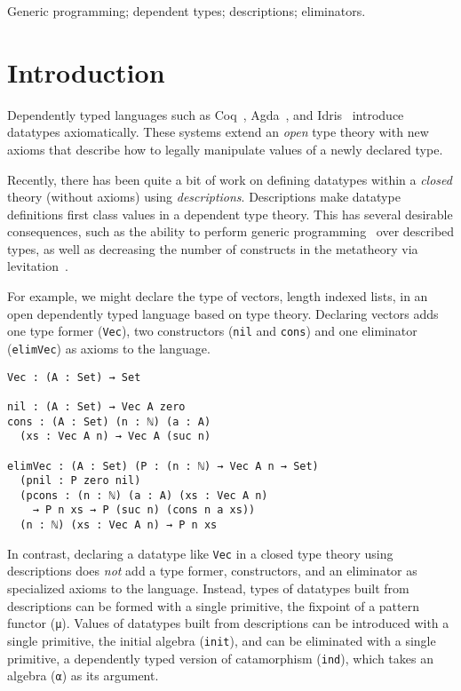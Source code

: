 \documentclass[preprint,nonatbib]{sigplanconf}
\begin{document}
\keywords
Generic programming; dependent types; descriptions; eliminators.

\section{Introduction}
\label{sec:intro}
Dependently typed languages such as
{\sc Coq}~\citep{coq08},
{\sc Agda}~\citep{norell2007towards}, and 
{\sc Idris}~\citep{brady2011idris} 
introduce datatypes axiomatically.
These systems extend an {\it open} type theory with new axioms that
describe how to legally manipulate values of a newly declared type.


Recently, there has been quite a bit of work on defining datatypes
within a {\it closed}
theory (without axioms) using {\it descriptions}.
Descriptions make datatype definitions first class values in a
dependent type theory. This has several desirable consequences, such as the
ability to perform generic programming~\citep{Chapman:2010:GAL:1932681.1863547,mcbride2010ornamental,dagand:phd}
over described types, as well as decreasing the number of constructs in the
metatheory via
levitation~\citep{Chapman:2010:GAL:1932681.1863547,dagand:phd}. 

For example, we might declare the type of vectors, length indexed
lists, in an open dependently typed language based on
\citet{martin1975intuitionistic} type theory.
Declaring vectors adds one type former ({\tt Vec}),
two constructors ({\tt nil} and {\tt cons}) and one
eliminator ({\tt elimVec}) as axioms to the language.

\begin{verbatim}
Vec : (A : Set) → Set

nil : (A : Set) → Vec A zero
cons : (A : Set) (n : ℕ) (a : A)
  (xs : Vec A n) → Vec A (suc n)

elimVec : (A : Set) (P : (n : ℕ) → Vec A n → Set)
  (pnil : P zero nil)
  (pcons : (n : ℕ) (a : A) (xs : Vec A n)
    → P n xs → P (suc n) (cons n a xs))
  (n : ℕ) (xs : Vec A n) → P n xs
\end{verbatim}

In contrast, declaring a datatype like {\tt Vec} in a closed type
theory using descriptions does {\it not} add a type former, constructors, and an
eliminator as specialized axioms to the language. Instead, types of
datatypes built from descriptions can be formed with a single
primitive, the fixpoint of a pattern functor ({\tt μ}). Values of
datatypes built from descriptions can be introduced with a single
primitive, the initial algebra ({\tt init}), and can be eliminated with
a single primitive, a dependently typed version of catamorphism
({\tt ind}), which takes an algebra ({\tt α}) as its argument.
\end{document}

